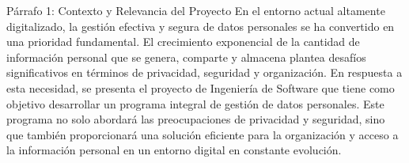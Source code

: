 Párrafo 1: Contexto y Relevancia del Proyecto
En el entorno actual altamente digitalizado, la gestión efectiva y segura de datos personales se ha convertido en una prioridad fundamental. El crecimiento exponencial de la cantidad de información personal que se genera, comparte y almacena plantea desafíos significativos en términos de privacidad, seguridad y organización. En respuesta a esta necesidad, se presenta el proyecto de Ingeniería de Software que tiene como objetivo desarrollar un programa integral de gestión de datos personales. Este programa no solo abordará las preocupaciones de privacidad y seguridad, sino que también proporcionará una solución eficiente para la organización y acceso a la información personal en un entorno digital en constante evolución.
